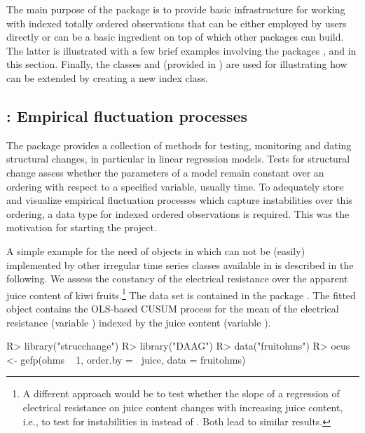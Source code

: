\documentclass[article,nojss]{jss}
\begin{document}
The main purpose of the package  is to provide basic infrastructure for
working with indexed totally ordered observations that can be either employed by
users directly or can be a basic ingredient on top of which other packages can
build. The latter is illustrated with a few brief examples involving the packages
,  and  in this section. Finally, the 
classes  and  (provided in )
are used for illustrating how  can be extended by creating a new index class.

\subsection[strucchange: Empirical fluctuation processes]{: Empirical fluctuation processes}
\label{sec:strucchange}

The package  provides a collection of methods for testing,
monitoring and dating structural changes, in particular in linear regression models.
Tests for structural change assess whether the parameters of a model remain
constant over an ordering with respect to a specified variable, usually time.
To adequately store and visualize empirical fluctuation processes which 
capture instabilities over this ordering, a data type for indexed ordered
observations is required. This was the motivation for starting the 
project.

A simple example for the need of  objects in 
which can not be (easily) implemented by other irregular time series classes
available in  is described in the following. We assess the constancy of the
electrical resistance over the apparent juice content of kiwi fruits.\footnote{A different
approach would be to test whether the slope of a regression of electrical resistance
on juice content changes with increasing juice content, i.e., to test for
instabilities in  instead of . Both lead to 
similar results.} The data
set  is contained in the  package \citep{zoo:DAAG:2004}.
The fitted  object contains the OLS-based CUSUM process for the mean
of the electrical resistance (variable ) indexed by the juice
content (variable ).

\begin{Schunk}
\begin{Sinput}
R> library("strucchange")
R> library("DAAG")
R> data("fruitohms")
R> ocus <- gefp(ohms ~ 1, order.by = ~juice, data = fruitohms)
\end{Sinput}
\end{Schunk}
\end{document}
